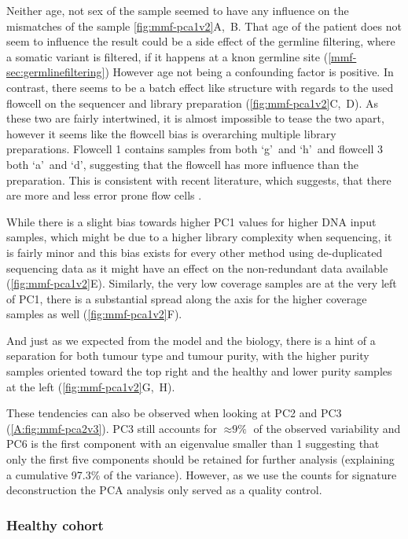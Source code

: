 Neither age, not sex of the sample seemed to have any influence on the mismatches of the sample \autoref{fig:mmf-pca1v2}A,~B. That age of the patient does not seem to influence the result could be a side effect of the germline filtering, where a somatic variant is filtered, if it happens at a knon germline site (\autoref{mmf-sec:germlinefiltering}) However age not being a confounding factor is positive.
In contrast, there seems to be a batch effect like structure with regards to the used flowcell on the sequencer and library preparation (\autoref{fig:mmf-pca1v2}C,~D). As these two are fairly intertwined, it is almost impossible to tease the two apart, however it seems like the flowcell bias is overarching multiple library preparations. Flowcell 1 contains samples from both \lq g\rq\ and \lq h\rq\ and  flowcell 3 both \lq a\rq\ and \lq d\rq, suggesting that the flowcell has more influence than the preparation. This is consistent with recent literature, which suggests, that there are more and less error prone flow cells \cite{Stoler2021}.

While there is a slight bias towards higher PC1 values for higher DNA input samples, which might be due to a higher library complexity when sequencing, it is fairly minor and this bias exists for every other method using de-duplicated sequencing data as it might have an effect on the non-redundant data available (\autoref{fig:mmf-pca1v2}E). Similarly, the very low coverage samples are at the very left of PC1, there is a substantial spread along the axis for the higher coverage samples as well (\autoref{fig:mmf-pca1v2}F). 

And just as we expected from the model and the biology, there is a hint of a separation for both tumour type and tumour purity, with the higher purity samples oriented toward the top right and the healthy and lower purity samples at the left (\autoref{fig:mmf-pca1v2}G,~H).

These tendencies can also be observed when looking at PC2 and PC3 (\autoref{A:fig:mmf-pca2v3}). PC3 still accounts for $\approx \text{9\%}$ of the observed variability and PC6 is the first component with an eigenvalue smaller than 1 suggesting that only the first five components should be retained for further analysis (explaining a cumulative 97.3\% of the variance). However, as we use the counts for signature deconstruction the PCA analysis only served as a quality control.

\subsubsection{Healthy cohort}
\label{mmf-sec:healthy}

